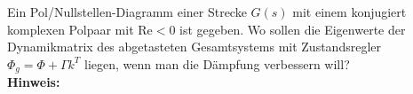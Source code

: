 \begin{question}[section=8,name={Pol/Nullstellen-Diagramm},difficulty=,type=mdl,tags={}]
	Ein Pol/Nullstellen-Diagramm einer Strecke $G(s)$ mit einem konjugiert komplexen Polpaar mit $\textrm{Re} < 0$ ist gegeben. Wo sollen die Eigenwerte der Dynamikmatrix des abgetasteten Gesamtsystems mit Zustandsregler $\Phi_g = \Phi + \Gamma k^T$ liegen, wenn man die Dämpfung verbessern will?
	\\ \textbf{Hinweis:}\\
	
\end{question}
\begin{solution}
	
\end{solution}